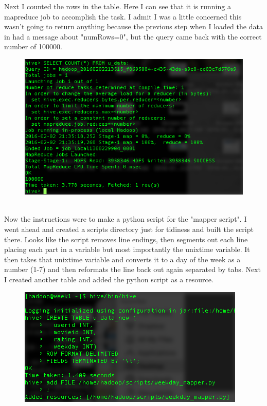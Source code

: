 \documentclass[10pt]{article}
\begin{document}
\indent Next I counted the rows in the table. Here I can see that it is running a mapreduce job to accomplish the task. I admit I was a little concerned this wasn't going to return anything because the previous step when I loaded the data in had a message about "numRows=0", but the query came back with the correct number of 100000.
\begin{figure}[!h]
\includegraphics[scale=0.37]{count_rows.png}
\centering
\end{figure}\\
\indent Now the instructions were to make a python script for the "mapper script". I went ahead and created a scripts directory just for tidiness and built the script there. Looks like the script removes line endings, then segments out each line placing each part in a variable but most importantly the unixtime variable. It then takes that unixtime variable and converts it to a day of the week as a number (1-7) and then reformats the line back out again separated by tabs. Next I created another table and added the python script as a resource.
\begin{figure}[!h]
\includegraphics[scale=0.37]{add_file.png}
\centering
\end{figure}\\
\end{document}
